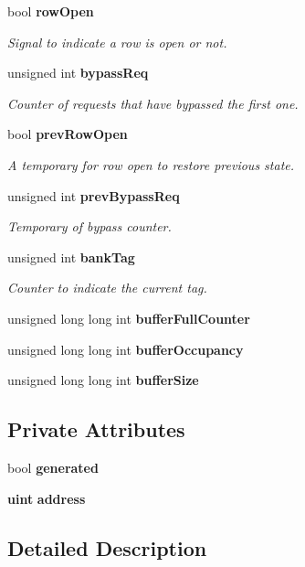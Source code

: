 \begin{CompactItemize}
bool {\bf rowOpen}
\begin{CompactList}\small\item\em Signal to indicate a row is open or not. \item\end{CompactList}\item 
unsigned int {\bf bypassReq}
\begin{CompactList}\small\item\em Counter of requests that have bypassed the first one. \item\end{CompactList}\item 
bool {\bf prevRowOpen}
\begin{CompactList}\small\item\em A temporary for row open to restore previous state. \item\end{CompactList}\item 
unsigned int {\bf prevBypassReq}
\begin{CompactList}\small\item\em Temporary of bypass counter. \item\end{CompactList}\item 
unsigned int {\bf bankTag}
\begin{CompactList}\small\item\em Counter to indicate the current tag. \item\end{CompactList}\item 
unsigned long long int {\bf bufferFullCounter}
\item 
unsigned long long int {\bf bufferOccupancy}
\item 
unsigned long long int {\bf bufferSize}
\end{CompactItemize}
\subsection*{Private Attributes}
\begin{CompactItemize}
\item 
bool {\bf generated}
\item 
{\bf uint} {\bf address}
\end{CompactItemize}


\subsection{Detailed Description}


